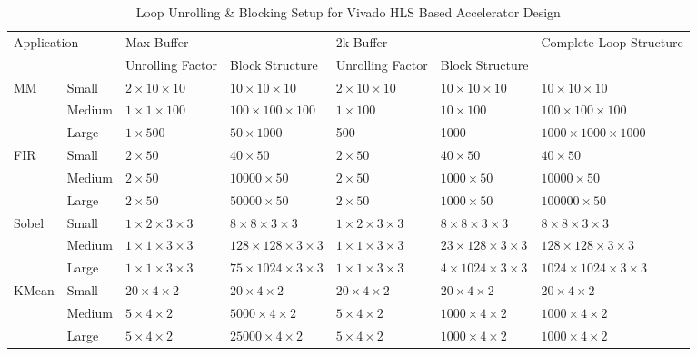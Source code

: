 \begin{table*}[t]
\centering
\caption{Loop Unrolling \& Blocking Setup for Vivado HLS Based Accelerator Design}
\label{tab:loop-unrolling-setup-vivado}
\begin{tabular}{|l|l|l|l|l|l|l|}
\hline
\multicolumn{2}{|l|}{\multirow{2}{*}{Application}} & \multicolumn{2}{l|}{Max-Buffer} & \multicolumn{2}{l|}{2k-Buffer} & \multirow{2}{*}{Complete Loop Structure} \\ \cline{3-6}
\multicolumn{2}{|l|}{} & Unrolling Factor & Block Structure & Unrolling Factor & Block Structure & \\ \hline
\multirow{3}{*}{MM} & Small & $2 \times 10 \times 10$ & $10 \times 10 \times 10$ & $2 \times 10 \times 10$ & $10 \times 10 \times 10$ & $10 \times 10 \times 10$ \\ \cline{2-7} 
                    & Medium & $1 \times 1 \times 100$ & $100 \times 100 \times 100$ & $1 \times 100$ & $10 \times 100$ & $100 \times 100 \times 100$ \\ \cline{2-7} 
                    & Large & $1 \times 500$ & $50 \times 1000$ & 500 & 1000  & $1000 \times 1000 \times 1000$ \\ \hline
\multirow{3}{*}{FIR} & Small & $2 \times 50$ & $40 \times 50$ & $2 \times 50$ & $40 \times 50$ & $40 \times 50$ \\ \cline{2-7} 
                     & Medium & $2 \times 50$ & $10000 \times 50$ & $2 \times 50$ & $1000 \times 50$ & $10000 \times 50$ \\ \cline{2-7} 
                     & Large & $2 \times 50$ & $50000 \times 50$ & $2 \times 50$ & $1000 \times 50$ & $100000 \times 50$ \\ \hline
\multirow{3}{*}{Sobel} & Small & $1 \times 2 \times 3 \times 3$ & $8 \times 8 \times 3 \times 3$ & $1 \times 2 \times 3 \times 3$ & $8 \times 8 \times 3 \times 3$ & $8 \times 8 \times 3 \times 3$ \\ \cline{2-7} 
                       & Medium & $1 \times 1 \times 3 \times 3$ & $128 \times 128 \times 3 \times 3$ & $1 \times 1 \times 3 \times 3$ & $23 \times 128 \times 3 \times 3$ & $128 \times 128 \times 3 \times 3$ \\ \cline{2-7} 
                       & Large & $1 \times 1 \times 3 \times 3$ & $75 \times 1024 \times 3 \times 3$ & $1 \times 1 \times 3 \times 3$ & $4 \times 1024 \times 3 \times 3$ & $1024 \times 1024 \times 3 \times 3$ \\ \hline
\multirow{3}{*}{KMean} & Small & $20 \times 4 \times 2$ & $20 \times 4 \times 2$ & $20 \times 4 \times 2$ & $20 \times 4 \times 2$ & $20 \times 4 \times 2$ \\ \cline{2-7} 
                       & Medium & $5 \times 4 \times 2$ & $5000 \times 4 \times 2$ & $5 \times 4 \times 2$ & $1000 \times 4 \times 2$ & $1000 \times 4 \times 2$ \\ \cline{2-7} 
                       & Large & $5 \times 4 \times 2$ & $25000 \times 4 \times 2$ & $5 \times 4 \times 2$ & $1000 \times 4 \times 2$ & $1000 \times 4 \times 2$ \\ \hline
\end{tabular}
\end{table*}

